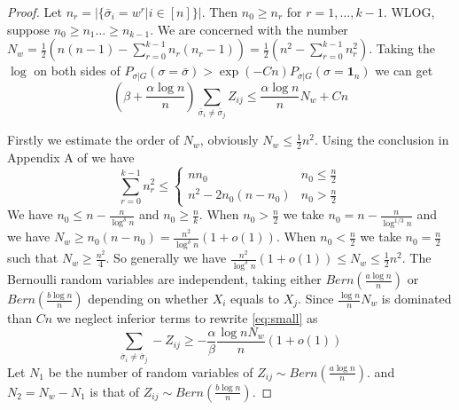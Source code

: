 \documentclass{article}
\begin{document}
\begin{proof}
	Let $n_r = |\{\bar{\sigma}_i = w^r | i\in [n] \}|$. Then $n_0 \geq n_r$ for $r=1, \dots, k-1$.
	WLOG, suppose $n_0 \geq n_1 \dots \geq n_{k-1}$.
	We are concerned with the number $N_w = \frac{1}{2}(n(n-1) - \sum_{r=0}^{k-1} n_r(n_r-1))
	=\frac{1}{2}(n^2 - \sum_{r=0}^{k-1} n_r^2)$.
	Taking the $\log$ on both sides of $P_{\sigma | G}(\sigma = \bar{\sigma} ) > \exp(-Cn) P_{\sigma | G}(\sigma = \mathbf{1}_n)$ we can get
	\begin{equation}\label{eq:small}
	(\beta + \frac{\alpha \log n}{n}) \sum_{\bar{\sigma}_i  \neq \bar{\sigma}_j} Z_{ij} \leq \frac{\alpha \log n}{n} N_w + C n
	\end{equation}
	
	Firstly we estimate the order of $N_w$, obviously $N_w \leq \frac{1}{2} n^2$.
	Using the conclusion in Appendix A of \cite{yixin} we have
	\begin{equation}
	\sum_{r=0}^{k-1} n_r^2 \leq
	\begin{cases}
	n n_0 & n_0 \leq \frac{n}{2} \\
	n^2 - 2n_0(n-n_0) & n_0 > \frac{n}{2}
	\end{cases}
	\end{equation}
	We have $n_0 \leq n - \frac{n}{\log^{\delta} n}$ and $n_0 \geq \frac{n}{k}$. When $n_0 > \frac{n}{2}$ we take $n_0 = n - \frac{n}{\log^{1/3} n}$
	and we have $N_w \geq n_0 (n - n_0) = \frac{n^2}{\log^{\delta} n}(1+o(1))$. When $n_0 < \frac{n}{2}$ we take $n_0 = \frac{n}{2}$ such that
	$N_w \geq \frac{n^2}{4}$. So generally we have $\frac{n^2}{\log^{\delta} n}(1+o(1)) \leq N_w \leq \frac{1}{2}n^2$.
	The Bernoulli random variables are independent, taking either $Bern(\frac{a\log n}{n})$ or $Bern(\frac{b \log n}{n})$ depending on whether
	$X_i$ equals to $X_j$.
	Since $\frac{\log n}{n} N_w$ is dominated than $Cn$ we neglect inferior terms to rewrite \eqref{eq:small} as
	\begin{equation}
		\sum_{ \bar{\sigma}_i  \neq \bar{\sigma}_j } -Z_{ij} \geq -\frac{\alpha}{\beta}\frac{\log n N_w}{n}(1+o(1))
	\end{equation}
	Let $N_1$ be the number of random variables of $Z_{ij} \sim Bern(\frac{a\log n}{n})$.
	and $N_2 = N_w - N_1$ is that of $Z_{ij} \sim Bern(\frac{b\log n}{n})$.
	

\end{proof}
\end{document}
